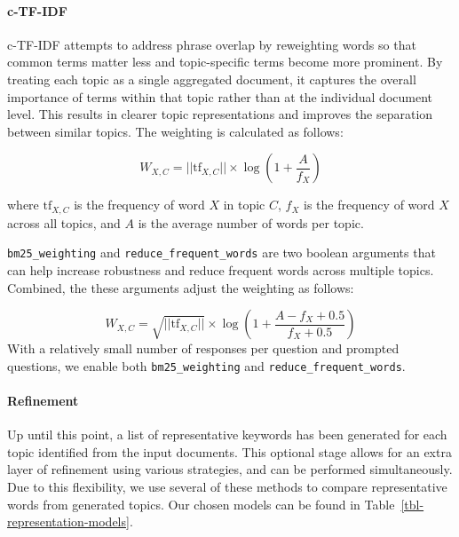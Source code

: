 \documentclass[phd]{nuthesis}
\begin{document}
\paragraph{c-TF-IDF}\label{c-tf-idf}

c-TF-IDF attempts to address phrase overlap by reweighting words so that
common terms matter less and topic-specific terms become more prominent.
By treating each topic as a single aggregated document, it captures the
overall importance of terms within that topic rather than at the
individual document level. This results in clearer topic representations
and improves the separation between similar topics. The weighting is
calculated as follows:

\[
W_{X,C}=||\text{tf}_{X,C}||\times\log(1+\frac{A}{f_X})
\]

where \(\text{tf}_{X,C}\) is the frequency of word \(X\) in topic \(C\),
\(f_X\) is the frequency of word \(X\) across all topics, and \(A\) is
the average number of words per topic.

\texttt{bm25\_weighting} and \texttt{reduce\_frequent\_words} are two
boolean arguments that can help increase robustness and reduce frequent
words across multiple topics. Combined, the these arguments adjust the
weighting as follows:

\[
W_{X,C}=\sqrt{||\text{tf}_{X,C}||}\times\log(1+\frac{A-f_X+0.5}{f_X+0.5})
\] With a relatively small number of responses per question and prompted
questions, we enable both \texttt{bm25\_weighting} and
\texttt{reduce\_frequent\_words}.

\paragraph{Refinement}\label{refinement}

Up until this point, a list of representative keywords has been
generated for each topic identified from the input documents. This
optional stage allows for an extra layer of refinement using various
strategies, and can be performed simultaneously. Due to this
flexibility, we use several of these methods to compare representative
words from generated topics. Our chosen models can be found in
Table~\ref{tbl-representation-models}.
\end{document}
